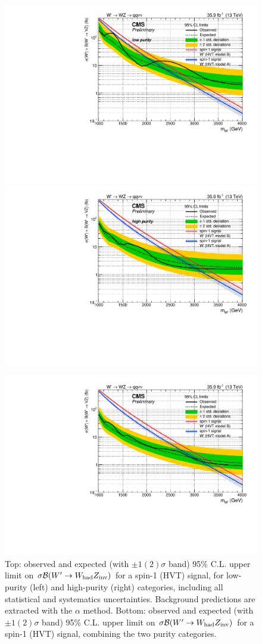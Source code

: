 \begin{figure}[!htb]
  \begin{center}
     \includegraphics[width=.495\textwidth]{v9/plotsAlpha/Limits/Exclusion_XWZInv_XVZnnlp_asymptotic.pdf}%
     \includegraphics[width=.495\textwidth]{v9/plotsAlpha/Limits/Exclusion_XWZInv_XVZnnhp_asymptotic.pdf}

     \includegraphics[width=.495\textwidth]{v9/plotsAlpha/Limits/Exclusion_XWZInv_XVZnn_asymptotic.pdf}
  \end{center}
  \caption{Top: observed and expected (with $\pm1(2)\sigma$ band) 95\% C.L. upper limit on $\sigma \mathcal{B} (W' \rightarrow W_{\text{had}} Z_{\text{inv}})$ for a spin-1 (HVT) signal, for low-purity (left) and high-purity (right) categories, including all statistical and systematics uncertainties. Background predictions are extracted with the $\alpha$ method. Bottom: observed and expected (with $\pm1(2)\sigma$ band) 95\% C.L. upper limit on $\sigma \mathcal{B} (W' \rightarrow W_{\text{had}} Z_{\text{inv}})$ for a spin-1 (HVT) signal, combining the two purity categories.}
  \label{fig:Limit_XWZInv}
\end{figure}

